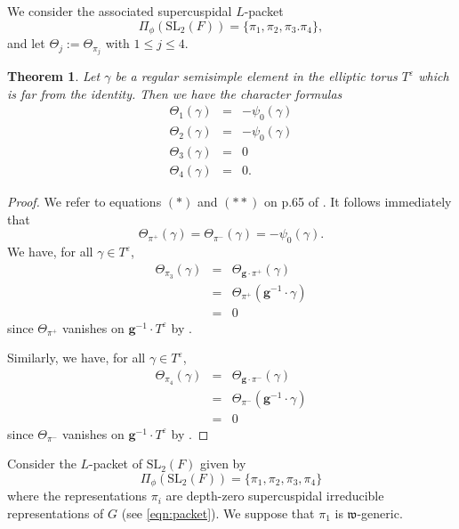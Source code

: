 \documentclass[11pt]{amsart}
\numberwithin{equation}{section}
\newtheorem{thm}[equation]{Theorem}
\def\cInd{\mathrm{c\!\!-\!\!Ind}}
\def\g{\mathbf{g}}
\def\fw{\mathfrak{w}}
\def\SL{\mathrm{SL}}
\def\bbT{\mathbb{T}}
\def\g{\mathbf{g}}
\newcommand{\<}{\left\langle}
\renewcommand{\>}{\right\rangle}
\begin{document}
We consider the associated supercuspidal $L$-packet  
\[
\Pi_\phi(\SL_2(F)) = \{\pi_1, \pi_2, \pi_3. \pi_4\},
\]
and let $\Theta_j := \Theta_{\pi_j}$ with $1 \leq j \leq 4$. 


\begin{thm}\label{FAR}  Let $\gamma$ be a regular semisimple element 
in the elliptic torus $T^\varepsilon$ which is far from the identity. Then we have the character formulas
 \begin{eqnarray*}
\Theta_1(\gamma)  &=&  - \psi_0(\gamma)\\
 \Theta_2(\gamma)  &=& -\psi_0(\gamma)\\
  \Theta_3(\gamma)  &=&  0\\
 \Theta_4(\gamma)  &=& 0.
 \end{eqnarray*}    
 \end{thm} 
 \begin{proof}   We refer to equations $(*)$ and $(**)$ on p.65 of \cite{ADSS}.  It follows immediately that 
  \[
 \Theta_{\pi^+}(\gamma) =  \Theta_{\pi^-}(\gamma)  = - \psi_0(\gamma).
 \]
 We have, for all $\gamma \in T^\varepsilon$, 
 \begin{eqnarray*}
 \Theta_{\pi_3}(\gamma) &=& \Theta_{\g \cdot \pi^+}(\gamma)\\
 &=& \Theta_{\pi^+}(\g^{-1}\cdot \gamma)\\
 &=& 0
 \end{eqnarray*}
 since $\Theta_{\pi^+}$ vanishes on $\g^{-1} \cdot T^\varepsilon$ by \cite[Theorem 15.1]{ADSS}.   
 
Similarly, we have, for all $\gamma \in T^\varepsilon$, 
\begin{eqnarray*}
 \Theta_{\pi_4}(\gamma) &=& \Theta_{\g \cdot \pi^-}(\gamma)\\
 &=& \Theta_{\pi^-}(\g^{-1}\cdot \gamma)\\
 &=& 0
 \end{eqnarray*}
 since $\Theta_{\pi^-}$ vanishes on $\g^{-1} \cdot T^{\varepsilon}$ by \cite[Theorem 15.1]{ADSS}.
 \end{proof}
 
 Consider the $L$-packet of $\SL_2(F)$ given by
\begin{equation}
\Pi_{\phi}(\SL_2(F)) = \{\pi_1, \pi_2, \pi_3, \pi_4\}
\end{equation}
where the representations $\pi_i$ are depth-zero supercuspidal irreducible representations of $G$ (see \eqref{eqn:packet}).
We  suppose that $\pi_1$ is $\fw$-generic.   
\end{document}
